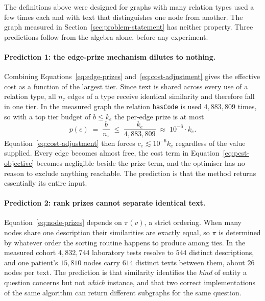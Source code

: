 The definitions above were designed for graphs with many relation types used a
few times each and with text that distinguishes one node from another. The graph
measured in Section~\ref{sec:problem-statement} has neither property. Three
predictions follow from the algebra alone, before any experiment.

\paragraph{Prediction 1: the edge-prize mechanism dilutes to nothing.} Combining
Equations~\ref{eq:edge-prizes} and~\ref{eq:cost-adjustment} gives the effective
cost as a function of the largest tier. Since text is shared across every use of
a relation type, all $n_\tau$ edges of a type receive identical similarity and
therefore fall in one tier. In the measured graph the relation \texttt{hasCode}
is used $4{,}883{,}809$ times, so with a top tier budget of $b \le k_e$ the
per-edge prize is at most
%
\begin{equation}
p(e) \;=\; \frac{b}{n_\tau} \;\leq\; \frac{k_e}{4{,}883{,}809} \;\approx\; 10^{-6} \cdot k_e .
\label{eq:dilution}
\end{equation}
%
Equation~\ref{eq:cost-adjustment} then forces $c_e \lesssim 10^{-6} k_e$
regardless of the value supplied. Every edge becomes almost free, the cost term
in Equation~\ref{eq:pcst-objective} becomes negligible beside the prize term, and
the optimiser has no reason to exclude anything reachable. The prediction is that
the method returns essentially its entire input.

\paragraph{Prediction 2: rank prizes cannot separate identical text.}
Equation~\ref{eq:node-prizes} depends on $\pi(v)$, a strict ordering. When many
nodes share one description their similarities are exactly equal, so $\pi$ is
determined by whatever order the sorting routine happens to produce among ties.
In the measured cohort $4{,}832{,}744$ laboratory tests resolve to $544$ distinct
descriptions, and one patient's $15{,}810$ nodes carry $614$ distinct texts
between them, about $26$ nodes per text. The prediction is that similarity
identifies the
\emph{kind} of entity a question concerns but not \emph{which} instance, and that
two correct implementations of the same algorithm can return different subgraphs
for the same question.

